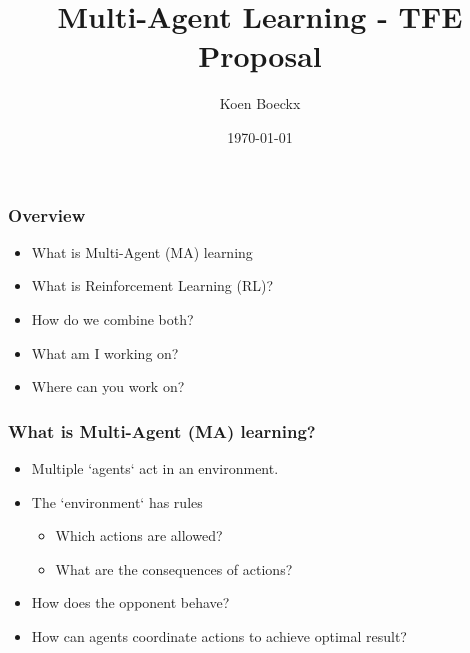 \documentclass{beamer}
\title{Multi-Agent Learning - TFE Proposal}
\author{Koen Boeckx}
\institute{RMA}
\date{\today}
\begin{document}
\begin{frame}
\titlepage
\end{frame}

\begin{frame}
\frametitle{Overview}
\begin{itemize}
    \item What is Multi-Agent (MA) learning
    \item What is Reinforcement Learning (RL)?
    \item How do we combine both?
    \item What am I working on?
    \item Where can you work on?
\end{itemize}
\end{frame}

\begin{frame}
\frametitle{What is Multi-Agent (MA) learning?}
\begin{itemize}
    \item Multiple `agents` act in an environment.
    \item The `environment` has rules
        \begin{itemize}
            \item Which actions are allowed?
            \item What are the consequences of actions?
        \end{itemize} 
    \item How does the opponent behave?
    \item How can agents coordinate actions to achieve optimal result?
\end{itemize}
\end{frame}
\end{document}
